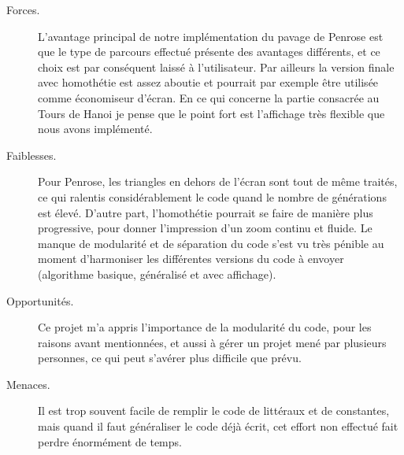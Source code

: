\documentclass[a4paper, 11pt]{article}%
\begin{document}
	\begin{description}
		\item[Forces.] L'avantage principal de notre implémentation du
                  pavage de Penrose est que le type de parcours
                  effectué présente des avantages différents, et ce
                  choix est par conséquent laissé à l'utilisateur. 
                  Par ailleurs la version finale avec homothétie est
                  assez aboutie et pourrait par exemple être utilisée
                  comme économiseur d'écran.
                  En ce qui concerne la partie consacrée au Tours de Hanoi
                  je pense que le point fort est l'affichage très flexible que nous avons
                  implémenté. 
		\item[Faiblesses.] Pour Penrose, les triangles en
                  dehors de l'écran sont tout de même traités, ce qui
                  ralentis considérablement le code quand le nombre de
                  générations est élevé. D'autre part, l'homothétie
                  pourrait se faire de manière plus progressive, pour
                  donner l'impression d'un zoom continu et fluide.
                  Le manque de modularité et de séparation du code
                  s'est vu très pénible au moment d'harmoniser les différentes versions
                  du code à envoyer (algorithme basique, généralisé et avec affichage).
		\item[Opportunités.] Ce projet m'a appris l'importance de la modularité
                  du code, pour les raisons avant mentionnées, et aussi à gérer un projet
                  mené par plusieurs personnes, ce qui peut s'avérer plus difficile que
                  prévu.
		\item[Menaces.] Il est trop souvent facile de remplir le code de
                  littéraux et de constantes, mais quand il faut généraliser le
                  code déjà écrit, cet effort non effectué fait perdre énormément de temps.
	\end{description}
	
\end{document}
